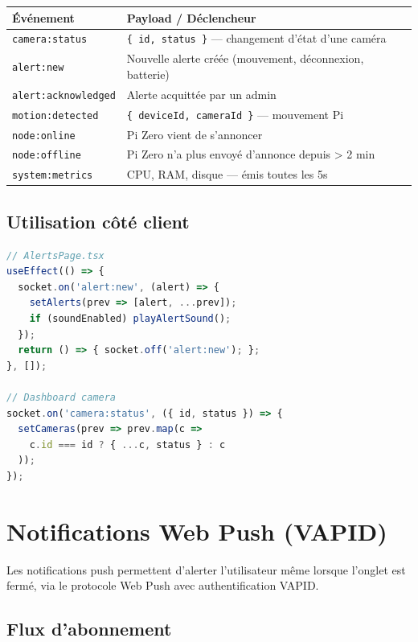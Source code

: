 \documentclass[12pt,a4paper]{article}
\begin{document}
\begin{longtable}{|l|p{8cm}|}
\hline
\textbf{Événement} & \textbf{Payload / Déclencheur} \\
\hline
\endhead
\hline
\endfoot
\texttt{camera:status} & \texttt{\{ id, status \}} — changement d'état d'une caméra \\
\texttt{alert:new} & Nouvelle alerte créée (mouvement, déconnexion, batterie) \\
\texttt{alert:acknowledged} & Alerte acquittée par un admin \\
\texttt{motion:detected} & \texttt{\{ deviceId, cameraId \}} — mouvement Pi \\
\texttt{node:online} & Pi Zero vient de s'annoncer \\
\texttt{node:offline} & Pi Zero n'a plus envoyé d'annonce depuis > 2 min \\
\texttt{system:metrics} & CPU, RAM, disque — émis toutes les 5s \\
\hline
\end{longtable}

\subsection{Utilisation côté client}

\begin{lstlisting}[language=typescript]
// AlertsPage.tsx
useEffect(() => {
  socket.on('alert:new', (alert) => {
    setAlerts(prev => [alert, ...prev]);
    if (soundEnabled) playAlertSound();
  });
  return () => { socket.off('alert:new'); };
}, []);

// Dashboard camera
socket.on('camera:status', ({ id, status }) => {
  setCameras(prev => prev.map(c =>
    c.id === id ? { ...c, status } : c
  ));
});
\end{lstlisting}

\section{Notifications Web Push (VAPID)}

Les notifications push permettent d'alerter l'utilisateur même lorsque l'onglet
est fermé, via le protocole Web Push avec authentification VAPID.

\subsection{Flux d'abonnement}
\end{document}
